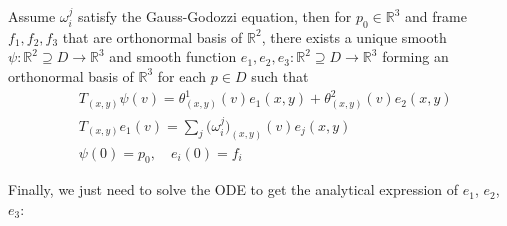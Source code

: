 \documentclass[10pt]{article}
\begin{document}
            \begin{lemma}
                Assume $\omega_i^j$ satisfy the Gauss-Godozzi equation, then for $p_0\in\mathbb{R}^3$ and frame $f_1,f_2,f_3$ that are orthonormal basis of $\mathbb{R}^2$, there exists a unique smooth $\psi:\mathbb{R}^2\supseteq D\rightarrow\mathbb{R}^3$ and smooth function $e_1, e_2, e_3: \mathbb{R}^2\supseteq D\rightarrow\mathbb{R}^3$ forming an orthonormal basis of $\mathbb{R}^3$ for each $p\in D$ such that
                \begin{equation*}
                    \begin{aligned}
                        &T_{(x,y)}\psi(v) = \theta_{(x,y)}^1(v) e_1(x,y) + \theta_{(x,y)}^2(v) e_2(x,y) \\
                        &T_{(x,y)}e_1(v) = \sum\limits_j\big(\omega_i^j\big)_{(x,y)}(v)e_j(x,y) \\
                        &\psi(0) = p_0, \quad e_i(0) = f_i
                    \end{aligned}
                \end{equation*}
            \end{lemma}
            Finally, we just need to solve the ODE to get the analytical expression of $e_1$, $e_2$, $e_3$:
\end{document}
